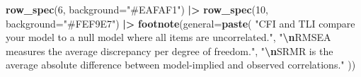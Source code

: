 \documentclass[
]{article}
\newenvironment{Shaded}{\begin{snugshade}}{\end{snugshade}}
\newcommand{\AttributeTok}[1]{\textcolor[rgb]{0.13,0.29,0.53}{#1}}
\newcommand{\DecValTok}[1]{\textcolor[rgb]{0.00,0.00,0.81}{#1}}
\newcommand{\FunctionTok}[1]{\textcolor[rgb]{0.13,0.29,0.53}{\textbf{#1}}}
\newcommand{\NormalTok}[1]{#1}
\newcommand{\SpecialCharTok}[1]{\textcolor[rgb]{0.81,0.36,0.00}{\textbf{#1}}}
\newcommand{\StringTok}[1]{\textcolor[rgb]{0.31,0.60,0.02}{#1}}
\begin{document}
\begin{Shaded}
\begin{Highlighting}[]
  \FunctionTok{row\_spec}\NormalTok{(}\DecValTok{6}\NormalTok{, }\AttributeTok{background=}\StringTok{"\#EAFAF1"}\NormalTok{) }\SpecialCharTok{|\textgreater{}}
  \FunctionTok{row\_spec}\NormalTok{(}\DecValTok{10}\NormalTok{, }\AttributeTok{background=}\StringTok{"\#FEF9E7"}\NormalTok{) }\SpecialCharTok{|\textgreater{}}
  \FunctionTok{footnote}\NormalTok{(}\AttributeTok{general=}\FunctionTok{paste}\NormalTok{(}
    \StringTok{"CFI and TLI compare your model to a null model where all items are uncorrelated."}\NormalTok{,}
    \StringTok{"}\SpecialCharTok{\textbackslash{}n}\StringTok{RMSEA measures the average discrepancy per degree of freedom."}\NormalTok{,}
    \StringTok{"}\SpecialCharTok{\textbackslash{}n}\StringTok{SRMR is the average absolute difference between model{-}implied and observed correlations."}
\NormalTok{  ))}
\end{Highlighting}
\end{Shaded}
\end{document}
